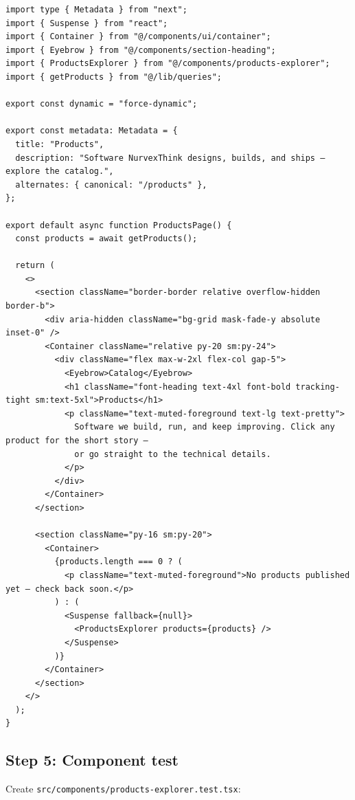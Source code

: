 \documentclass[11pt,a4paper]{article}
\begin{document}
\begin{lstlisting}
import type { Metadata } from "next";
import { Suspense } from "react";
import { Container } from "@/components/ui/container";
import { Eyebrow } from "@/components/section-heading";
import { ProductsExplorer } from "@/components/products-explorer";
import { getProducts } from "@/lib/queries";

export const dynamic = "force-dynamic";

export const metadata: Metadata = {
  title: "Products",
  description: "Software NurvexThink designs, builds, and ships — explore the catalog.",
  alternates: { canonical: "/products" },
};

export default async function ProductsPage() {
  const products = await getProducts();

  return (
    <>
      <section className="border-border relative overflow-hidden border-b">
        <div aria-hidden className="bg-grid mask-fade-y absolute inset-0" />
        <Container className="relative py-20 sm:py-24">
          <div className="flex max-w-2xl flex-col gap-5">
            <Eyebrow>Catalog</Eyebrow>
            <h1 className="font-heading text-4xl font-bold tracking-tight sm:text-5xl">Products</h1>
            <p className="text-muted-foreground text-lg text-pretty">
              Software we build, run, and keep improving. Click any product for the short story —
              or go straight to the technical details.
            </p>
          </div>
        </Container>
      </section>

      <section className="py-16 sm:py-20">
        <Container>
          {products.length === 0 ? (
            <p className="text-muted-foreground">No products published yet — check back soon.</p>
          ) : (
            <Suspense fallback={null}>
              <ProductsExplorer products={products} />
            </Suspense>
          )}
        </Container>
      </section>
    </>
  );
}
\end{lstlisting}

\subsection*{Step 5: Component test}

Create \texttt{src/components/products-explorer.test.tsx}:
\end{document}
